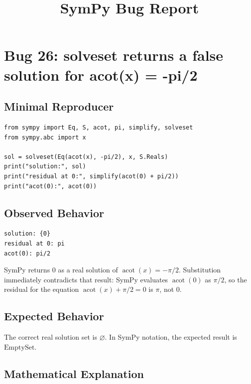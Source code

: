 \documentclass[11pt]{article}
\title{SymPy Bug Report}
\author{}
\date{}
\begin{document}
\maketitle

\section{Bug 26: solveset returns a false solution for acot(x) = -pi/2}

\subsection{Minimal Reproducer}

\medskip

\begin{lstlisting}[style=bugpython]
from sympy import Eq, S, acot, pi, simplify, solveset
from sympy.abc import x

sol = solveset(Eq(acot(x), -pi/2), x, S.Reals)
print("solution:", sol)
print("residual at 0:", simplify(acot(0) + pi/2))
print("acot(0):", acot(0))
\end{lstlisting}

\subsection{Observed Behavior}

\medskip

\begin{lstlisting}[style=bugpython]
solution: {0}
residual at 0: pi
acot(0): pi/2
\end{lstlisting}

SymPy returns \(0\) as a real solution of \(\operatorname{acot}(x)=-\pi/2\). Substitution immediately contradicts that result: SymPy evaluates \(\operatorname{acot}(0)\) as \(\pi/2\), so the residual for the equation \(\operatorname{acot}(x)+\pi/2=0\) is \(\pi\), not \(0\).

\subsection{Expected Behavior}

The correct real solution set is \(\varnothing\). In SymPy notation, the expected result is \(\mathrm{EmptySet}\).

\subsection{Mathematical Explanation}
\end{document}
